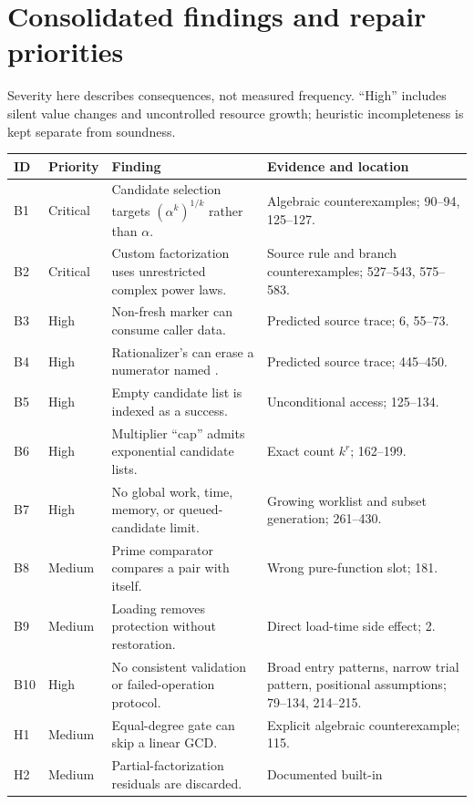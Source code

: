 \documentclass[11pt,letterpaper]{article}
\newcommand{\code}[1]{\texttt{\detokenize{#1}}}
\theoremstyle{definition}
\begin{document}
\section{Consolidated findings and repair priorities}
\label{sec:findings}

Severity here describes consequences, not measured frequency. ``High'' includes
silent value changes and uncontrolled resource growth; heuristic incompleteness is
kept separate from soundness.
\begin{longtable}{@{}>{\raggedright\arraybackslash}p{}>{\raggedright\arraybackslash}p{}>{\raggedright\arraybackslash}p{}>{\raggedright\arraybackslash}p{}@{}}
\toprule
ID & Priority & Finding & Evidence and location\\\midrule
\endhead
B1 & Critical & Candidate selection targets $(\alpha^k)^{1/k}$ rather than
$\alpha$. & Algebraic counterexamples; 90--94, 125--127.\\
B2 & Critical & Custom factorization uses unrestricted complex power laws. &
Source rule and branch counterexamples; 527--543, 575--583.\\
B3 & High & Non-fresh marker \code{f} can consume caller data. & Predicted source
trace; 6, 55--73.\\
B4 & High & Rationalizer's \code{x -> 0} can erase a numerator named \code{x}. &
Predicted source trace; 445--450.\\
B5 & High & Empty candidate list is indexed as a success. & Unconditional access;
125--134.\\
B6 & High & Multiplier ``cap'' admits exponential candidate lists. & Exact count
$k^r$; 162--199.\\
B7 & High & No global work, time, memory, or queued-candidate limit. & Growing
worklist and subset generation; 261--430.\\
B8 & Medium & Prime comparator compares a pair with itself. & Wrong pure-function
slot; 181.\\
B9 & Medium & Loading removes \code{Print} protection without restoration. &
Direct load-time side effect; 2.\\
B10 & High & No consistent validation or failed-operation protocol. & Broad entry
patterns, narrow trial pattern, positional assumptions; 79--134, 214--215.\\
H1 & Medium & Equal-degree gate can skip a linear GCD. & Explicit algebraic
counterexample; 115.\\
H2 & Medium & Partial-factorization residuals are discarded. & Documented built-in

\end{longtable}
\end{document}

